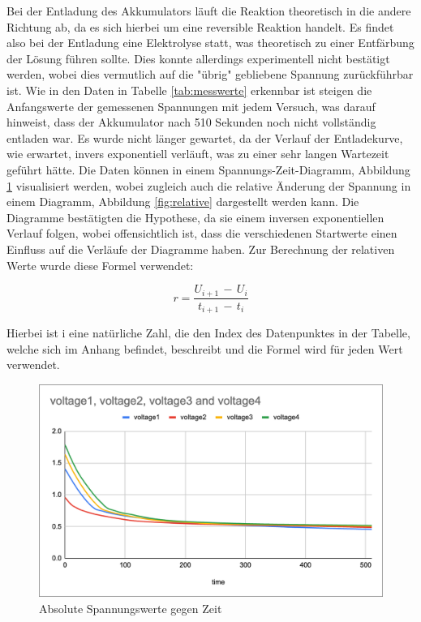 \documentclass[11pt]{article}
\begin{document}
\noindent
Bei der Entladung des Akkumulators läuft die Reaktion theoretisch in die andere Richtung ab, da es sich hierbei um eine reversible Reaktion handelt. Es findet also bei der Entladung eine Elektrolyse statt, was theoretisch zu einer Entfärbung der Lösung führen sollte. Dies konnte allerdings experimentell nicht bestätigt werden, wobei dies vermutlich auf die "übrig" gebliebene Spannung zurückführbar ist. Wie in den Daten in  Tabelle \ref{tab:messwerte} erkennbar ist steigen die Anfangswerte der gemessenen Spannungen mit jedem Versuch, was darauf hinweist, dass der Akkumulator nach 510 Sekunden noch nicht vollständig entladen war. Es wurde nicht länger gewartet, da der Verlauf der Entladekurve, wie erwartet, invers exponentiell verläuft, was zu einer sehr langen Wartezeit geführt hätte. Die Daten können in einem Spannungs-Zeit-Diagramm, Abbildung \ref{fig:absolute} visualisiert werden, wobei zugleich auch die relative Änderung der Spannung in einem Diagramm, Abbildung \ref{fig:relative} dargestellt werden kann. Die Diagramme bestätigten die Hypothese, da sie einem inversen exponentiellen Verlauf folgen, wobei offensichtlich ist, dass die verschiedenen Startwerte einen Einfluss auf die Verläufe der Diagramme haben. Zur Berechnung der relativen Werte wurde diese Formel verwendet:
\begin{center}
    \begin{equation}
        r = \frac{U_{i+1}\,-\,U_{i}}{t_{i+1}\,-\,t_{i}}
    \end{equation}
\end{center}
Hierbei ist i eine natürliche Zahl, die den Index des Datenpunktes in der Tabelle, welche sich im Anhang befindet, beschreibt und die Formel wird für jeden Wert verwendet.

\begin{figure}[h!]
    \caption{Absolute Spannungswerte gegen Zeit}
    \label{fig:absolute}
    \centering
    \includegraphics[scale=0.25]{absolute.png}
\end{figure}
\end{document}
